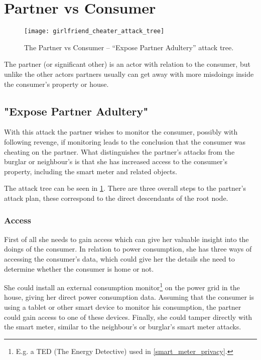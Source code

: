 
\section{Partner vs Consumer}

\begin{figure}
	\texttt{[image: girlfriend\_cheater\_attack\_tree]}
	\caption{The Partner vs Consumer -- ``Expose Partner Adultery'' attack tree.}
	\label{fig:attack_trees:partner:cheater}
\end{figure}

The partner (or significant other) is an actor with relation to the consumer, but unlike the other actors partners usually can get away with more misdoings inside the consumer's property or house.

\subsection{"Expose Partner Adultery"}

With this attack the partner wishes to monitor the consumer, possibly with following revenge, if monitoring leads to the conclusion that the consumer was cheating on the partner.
What distinguishes the partner's attacks from the burglar or neighbour's is that she has increased access to the consumer's property, including the smart meter and related objects.

The attack tree can be seen in \cref{fig:attack_trees:partner:cheater}.
There are three overall steps to the partner's attack plan, these correspond to the direct descendants of the root node.

\subsubsection{Access}
First of all she needs to gain access which can give her valuable insight into the doings of the consumer.
In relation to power consumption, she has three ways of accessing the consumer's data, which could give her the details she need to determine whether the consumer is home or not.

She could install an external consumption monitor\footnote{E.g. a TED (The Energy Detective) used in \cref {smart_meter_privacy}.} on the power grid in the house, giving her direct power consumption data.
Assuming that the consumer is using a tablet or other smart device to monitor his consumption, the partner could gain access to one of these devices.
Finally, she could tamper directly with the smart meter, similar to the neighbour's or burglar's smart meter attacks.

